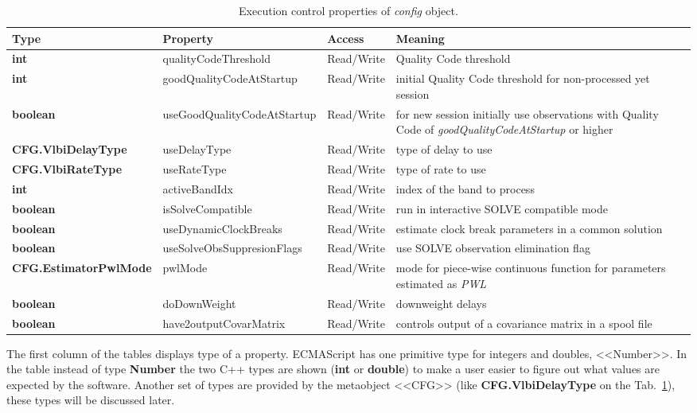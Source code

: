 \documentclass [10pt,letterpaper]{report}
\begin{document}
\begin{table}[htb]
\centering
\footnotesize
\begin{tabular}{lllp{}}
\hline
Type & Property & Access & Meaning\\
\hline
  {\bf int} & qualityCodeThreshold & Read/Write & Quality Code threshold\\
  {\bf int} & goodQualityCodeAtStartup & Read/Write & initial Quality Code threshold for non-processed yet session\\
  {\bf boolean} & useGoodQualityCodeAtStartup & Read/Write & for new session initially use observations with Quality Code of {\sl goodQualityCodeAtStartup} or higher\\
  {\bf CFG.VlbiDelayType} & useDelayType & Read/Write & type of delay to use\\
  {\bf CFG.VlbiRateType} & useRateType & Read/Write & type of rate to use\\
  {\bf int} & activeBandIdx & Read/Write & index of the band to process\\
  {\bf boolean} & isSolveCompatible & Read/Write & run in interactive SOLVE compatible mode\\
  {\bf boolean} & useDynamicClockBreaks & Read/Write & estimate clock break parameters in a common solution\\
  {\bf boolean} & useSolveObsSuppresionFlags & Read/Write & use SOLVE observation elimination flag\\
  {\bf CFG.EstimatorPwlMode} & pwlMode & Read/Write & mode for piece-wise continuous function for parameters estimated as {\sl PWL}\\
  {\bf boolean} & doDownWeight & Read/Write & downweight delays\\
  {\bf boolean} & have2outputCovarMatrix & Read/Write & controls output of a covariance matrix in a spool file\\
\hline
\end{tabular}
\caption{Execution control properties of {\sl config} object.}
\label{tab-scr-config-properties-1}
\end{table}

The first column of the tables displays type of a property. ECMAScript has
one primitive type for integers and doubles, <<Number>>. In the table instead
of type {\bf Number} the two C++ types are shown ({\bf int} or {\bf double})
to make a user easier to figure out what values are expected by the software.
Another set of types are provided by the metaobject <<CFG>> (like
{\bf CFG.VlbiDelayType} on the Tab.~\ref{tab-scr-config-properties-1}), these types
will be discussed later.
\end{document}

